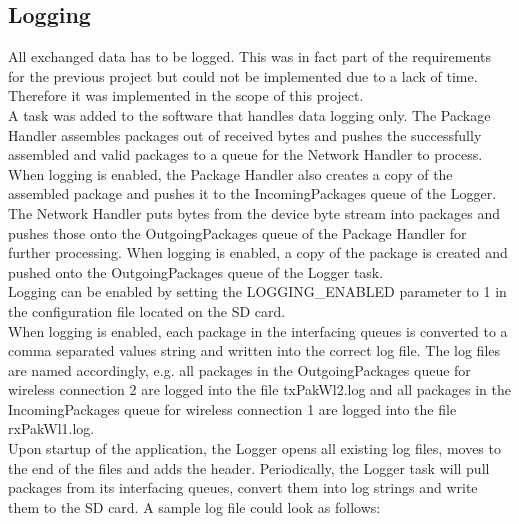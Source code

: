 \subsection{Logging} \label{subsec:txtLoggingTask}
All exchanged data has to be logged. This was in fact part of the requirements for the previous project but could not be implemented due to a lack of time. Therefore it was implemented in the scope of this project.\\
A task was added to the software that handles data logging only. The Package Handler assembles packages out of received bytes and pushes the successfully assembled and valid packages to a queue for the Network Handler to process. When logging is enabled, the Package Handler also creates a copy of the assembled package and pushes it to the IncomingPackages queue of the Logger.\\
The Network Handler puts bytes from the device byte stream into packages and pushes those onto the OutgoingPackages queue of the Package Handler for further processing. When logging is enabled, a copy of the package is created and pushed onto the OutgoingPackages queue of the Logger task.\\
Logging can be enabled by setting the LOGGING\_ENABLED parameter to 1 in the configuration file located on the SD card.\\
When logging is enabled, each package in the interfacing queues is converted to a comma separated values string and written into the correct log file. The log files are named accordingly, e.g. all packages in the OutgoingPackages queue for wireless connection 2 are logged into the file txPakWl2.log and all packages in the IncomingPackages queue for wireless connection 1 are logged into the file rxPakWl1.log.\\
Upon startup of the application, the Logger opens all existing log files, moves to the end of the files and adds the header. Periodically, the Logger task will pull packages from its interfacing queues, convert them into log strings and write them to the SD card. A sample log file could look as follows:\\
%
